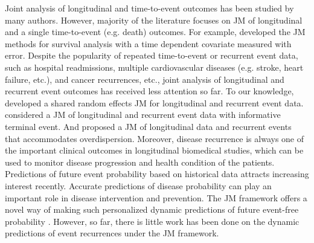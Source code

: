 Joint analysis of longitudinal and time-to-event outcomes has been studied by many authors. However, majority of the literature focuses on JM of longitudinal and a single time-to-event (e.g. death) outcomes. For example, \cite{self1992modeling, tsiatis1995modeling, wulfsohn1997joint} developed the JM methods for survival analysis with a time dependent covariate measured with error. Despite the popularity of repeated time-to-event or recurrent event data, such as hospital readmissions, multiple cardiovascular diseases (e.g. stroke, heart failure, etc.), and cancer recurrences, etc., joint analysis of longitudinal and recurrent event outcomes has received less attention so far. To our knowledge, \cite{henderson2000joint} developed a shared random effects JM for longitudinal and recurrent event data. \cite{kim2012joint} considered a JM of longitudinal and recurrent event data with informative terminal event. And \cite{efendi2013joint} proposed a JM of longitudinal data and recurrent events that accommodates overdispersion. Moreover, disease recurrence is always one of the important clinical outcomes in longitudinal biomedical studies, which can be used to monitor disease progression and health condition of the patients. Predictions of future event probability based on historical data attracts increasing interest recently. Accurate predictions of disease probability can play an important role in disease intervention and prevention. The JM framework offers a novel way of making such personalized dynamic predictions of future event-free probability \citep{rizopoulos2011dynamic,taylor2013real}. However, so far, there is little work has been done on the dynamic predictions of event recurrences under the JM framework. 


